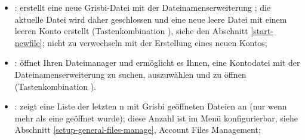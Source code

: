 \noindent
\begin{minipage}{.7\linewidth}
	\begin{itemize}[rightmargin=.6cm]
		\item {}: erstellt eine neue Grisbi-Datei mit der \gls{Dateinamenserweiterung} ; die aktuelle Datei wird daher geschlossen und eine neue leere Datei mit einem leeren Konto erstellt (Tastenkombination ), siehe den Abschnitt \vref{start-newfile}; nicht zu verwechseln mit der Erstellung eines neuen Kontos;%
		\item {}: öffnet Ihren Dateimanager und ermöglicht es Ihnen, eine Kontodatei mit der \gls{Dateinamenserweiterung}  zu suchen, auszuwählen und zu öffnen (Tastenkombination ).%
		\item {}: zeigt eine Liste der letzten n mit Grisbi geöffneten Dateien an (nur wenn mehr als eine geöffnet wurde); diese Anzahl ist im Menü  konfigurierbar, siehe Abschnitt \vref{setup-general-files-manage}, {Account Files Management}; %
	\end{itemize}
\end{minipage}
